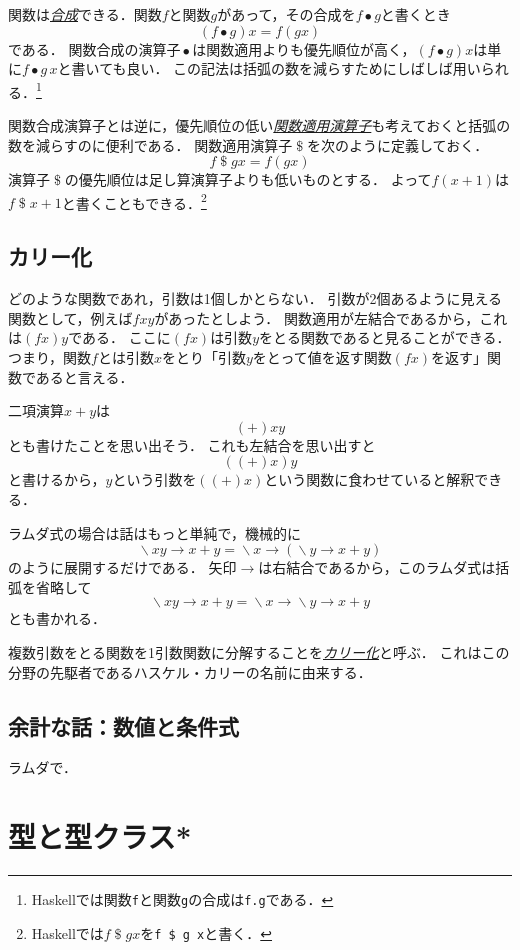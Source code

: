 \documentclass[twocolumn]{jsbook}
\newcommand{\keyword}[1]{\underline{\emph{#1}}}
\newcommand{\code}[1]{\texttt{#1}}
\DeclareMathOperator{\mathApply}{\$}
\DeclareMathOperator{\mathCompose}{\bullet}
\DeclareMathOperator{\mathLambda}{\backslash}
\newcommand{\mathLambdaArrow}{\rightarrow}
\newcommand{\mathLambdaExpression}[2]{\mathLambda#1\mathLambdaArrow#2}
\begin{document}
関数は\keyword{合成}できる．関数$f$と関数$g$があって，その合成を$f\mathCompose g$と書くとき$$(f\mathCompose g)x=f(gx)$$である．
関数合成の演算子$\mathCompose$は関数適用よりも優先順位が高く，$(f\mathCompose g)x$は単に$f\mathCompose g\,x$と書いても良い．
この記法は括弧の数を減らすためにしばしば用いられる．\footnote{Haskellでは関数\code{f}と関数\code{g}の合成は\code{f.g}である．}

関数合成演算子とは逆に，優先順位の低い\keyword{関数適用演算子}も考えておくと括弧の数を減らすのに便利である．
関数適用演算子$\mathApply$を次のように定義しておく．
$$f\mathApply gx=f(gx)$$
演算子$\mathApply$の優先順位は足し算演算子よりも低いものとする．
よって$f(x+1)$は$f\mathApply x+1$と書くこともできる．\footnote{Haskellでは$f\mathApply gx$を\code{f \$ g x}と書く．}

\section{カリー化}

どのような関数であれ，引数は1個しかとらない．
引数が2個あるように見える関数として，例えば$fxy$があったとしよう．
関数適用が左結合であるから，これは$(fx)y$である．
ここに$(fx)$は引数$y$をとる関数であると見ることができる．
つまり，関数$f$とは引数$x$をとり「引数$y$をとって値を返す関数$(fx)$を返す」関数であると言える．

二項演算$x+y$は$$(+)xy$$とも書けたことを思い出そう．
これも左結合を思い出すと$$((+)x)y$$と書けるから，$y$という引数を$((+)x)$という関数に食わせていると解釈できる．

ラムダ式の場合は話はもっと単純で，機械的に$$\mathLambdaExpression{xy}{x+y}=\mathLambdaExpression{x}{(\mathLambdaExpression{y}{x+y})}$$のように展開するだけである．
矢印$\mathLambdaArrow$は右結合であるから，このラムダ式は括弧を省略して$$\mathLambdaExpression{xy}{x+y}=\mathLambdaExpression{x}{\mathLambdaExpression{y}{x+y}}$$とも書かれる．

複数引数をとる関数を1引数関数に分解することを\keyword{カリー化}と呼ぶ．
これはこの分野の先駆者であるハスケル・カリーの名前に由来する．

\section*{余計な話：数値と条件式}

ラムダで．

\chapter{型と型クラス*}
\end{document}
